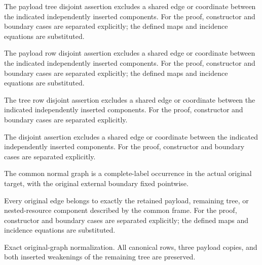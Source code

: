 The payload tree disjoint assertion excludes a shared edge or coordinate between the indicated independently inserted components.
For the proof, constructor and boundary cases are separated explicitly; the defined maps and incidence equations are substituted.
\par{}

The payload row disjoint assertion excludes a shared edge or coordinate between the indicated independently inserted components.
For the proof, constructor and boundary cases are separated explicitly; the defined maps and incidence equations are substituted.
\par{}

The tree row disjoint assertion excludes a shared edge or coordinate between the indicated independently inserted components.
For the proof, constructor and boundary cases are separated explicitly.
\par{}

The disjoint assertion excludes a shared edge or coordinate between the indicated independently inserted components.
For the proof, constructor and boundary cases are separated explicitly.
\par{}

The common normal graph is a complete-label occurrence in the actual original target, with the original external boundary fixed pointwise.
\par{}

Every original edge belongs to exactly the retained payload, remaining tree, or nested-resource component described by the common frame.
For the proof, constructor and boundary cases are separated explicitly; the defined maps and incidence equations are substituted.
\par{}

Exact original-graph normalization. All canonical rows, three payload copies, and both inserted weakenings of the remaining tree are preserved.
\par{}

